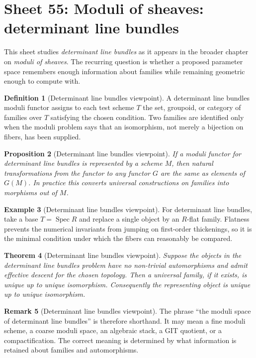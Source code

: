 \documentclass[11pt]{amsart}
\newtheorem{theorem}{Theorem}[section]
\newtheorem{proposition}[theorem]{Proposition}
\theoremstyle{definition}
\newtheorem{definition}[theorem]{Definition}
\newtheorem{example}[theorem]{Example}
\newtheorem{remark}[theorem]{Remark}
\newcommand{\Spec}{\operatorname{Spec}}
\begin{document}
\section{Sheet 55: Moduli of sheaves: determinant line bundles}
This sheet studies \emph{determinant line bundles} as it appears in the broader chapter on \emph{moduli of sheaves}.  The recurring question is whether a proposed parameter space remembers enough information about families while remaining geometric enough to compute with.
\begin{definition}[Determinant line bundles viewpoint]
A determinant line bundles moduli functor assigns to each test scheme $T$ the set, groupoid, or category of families over $T$ satisfying the chosen condition.  Two families are identified only when the moduli problem says that an isomorphism, not merely a bijection on fibers, has been supplied.
\end{definition}
\begin{proposition}[Determinant line bundles viewpoint]
If a moduli functor for determinant line bundles is represented by a scheme $M$, then natural transformations from the functor to any functor $G$ are the same as elements of $G(M)$.  In practice this converts universal constructions on families into morphisms out of $M$.
\end{proposition}
\begin{example}[Determinant line bundles viewpoint]
For determinant line bundles, take a base $T=\Spec R$ and replace a single object by an $R$-flat family.  Flatness prevents the numerical invariants from jumping on first-order thickenings, so it is the minimal condition under which the fibers can reasonably be compared.
\end{example}
\begin{theorem}[Determinant line bundles viewpoint]
Suppose the objects in the determinant line bundles problem have no non-trivial automorphisms and admit effective descent for the chosen topology.  Then a universal family, if it exists, is unique up to unique isomorphism.  Consequently the representing object is unique up to unique isomorphism.
\end{theorem}
\begin{remark}[Determinant line bundles viewpoint]
The phrase ``the moduli space of determinant line bundles'' is therefore shorthand.  It may mean a fine moduli scheme, a coarse moduli space, an algebraic stack, a GIT quotient, or a compactification.  The correct meaning is determined by what information is retained about families and automorphisms.
\end{remark}
\end{document}

